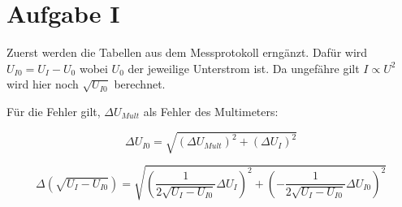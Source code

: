 \section{Aufgabe I}

Zuerst werden die Tabellen aus dem Messprotokoll erngänzt. Dafür wird
$U_{I0} = U_I - U_0$ wobei $U_0$ der jeweilige Unterstrom ist.  Da ungefähre gilt
$I \propto U^2$ wird hier noch $\sqrt{U_{I0}}$ berechnet.

Für die Fehler gilt, $\Delta U_{Mult}$ als Fehler des Multimeters:

\begin{equation}
    \Delta U_{I0} = \sqrt{(\Delta U_{Mult})^2 + (\Delta U_I)^2} 
\end{equation}

\begin{equation}
    \Delta \left(\sqrt{U_I  - U_{I0}}\right) = \sqrt{\left(\frac{1}{2\sqrt{U_I - U_{I0}}} \Delta U_I\right)^2 + \left(-\frac{1}{2\sqrt{U_I - U_{I0}}} \Delta U_{I0}\right)^2}
\end{equation}
